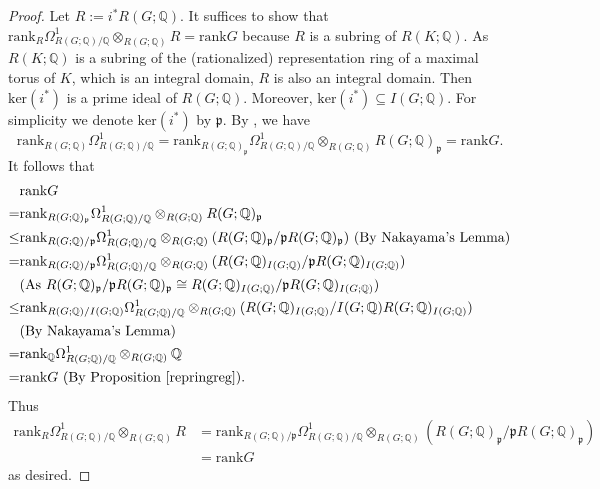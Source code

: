 \documentclass[11pt]{amsart}
\theoremstyle{plain}
\theoremstyle{definition}
\begin{document}
\begin{proof}
	Let $R:=i^*R(G; \mathbb{Q})$. It suffices to show that $\text{rank}_R\Omega^1_{R(G; \mathbb{Q})/\mathbb{Q}}\otimes_{R(G; \mathbb{Q})}R=\text{rank}G$ because $R$ is a subring of $R(K; \mathbb{Q})$. As $R(K; \mathbb{Q})$ is a subring of the (rationalized) representation ring of a maximal torus of $K$, which is an integral domain, $R$ is also an integral domain. Then $\text{ker}(i^*)$ is a prime ideal of $R(G; \mathbb{Q})$. Moreover, $\text{ker}(i^*)\subseteq I(G; \mathbb{Q})$. For simplicity we denote $\text{ker}(i^*)$ by $\mathfrak{p}$. By \cite[Lemmas 7.12(2) and 7.13]{CFok}, we have
	\[\text{rank}_{R(G; \mathbb{Q})}\Omega^1_{R(G; \mathbb{Q})/\mathbb{Q}}=\text{rank}_{R(G; \mathbb{Q})_{\mathfrak{p}}}\Omega^1_{R(G; \mathbb{Q})/\mathbb{Q}}\otimes_{R(G; \mathbb{Q})}R(G; \mathbb{Q})_{\mathfrak{p}}=\text{rank}G.\]
	It follows that 
	\begin{align*}
		&\text{rank}G\\
		=&\text{rank}_{R(G; \mathbb{Q})_{\mathfrak{p}}}\Omega^1_{R(G; \mathbb{Q})/\mathbb{Q}}\otimes_{R(G; \mathbb{Q})}R(G; \mathbb{Q})_{\mathfrak{p}}\\
		\leq &\text{rank}_{R(G; \mathbb{Q})/\mathfrak{p}}\Omega^1_{R(G; \mathbb{Q})/\mathbb{Q}}\otimes_{R(G; \mathbb{Q})}(R(G; \mathbb{Q})_{\mathfrak{p}}/\mathfrak{p}R(G; \mathbb{Q})_{\mathfrak{p}})\ (\text{By Nakayama's Lemma})\\
		=&\text{rank}_{R(G; \mathbb{Q})/\mathfrak{p}}\Omega^1_{R(G; \mathbb{Q})/\mathbb{Q}}\otimes_{R(G; \mathbb{Q})}(R(G; \mathbb{Q})_{I(G; \mathbb{Q})}/\mathfrak{p}R(G; \mathbb{Q})_{I(G; \mathbb{Q})})\\
		&(\text{As }R(G; \mathbb{Q})_{\mathfrak{p}}/\mathfrak{p}R(G; \mathbb{Q})_{\mathfrak{p}}\cong R(G; \mathbb{Q})_{I(G; \mathbb{Q})}/\mathfrak{p}R(G; \mathbb{Q})_{I(G; \mathbb{Q})})\\
		\leq&\text{rank}_{R(G; \mathbb{Q})/I(G; \mathbb{Q})}\Omega^1_{R(G; \mathbb{Q})/\mathbb{Q}}\otimes_{R(G; \mathbb{Q})}(R(G; \mathbb{Q})_{I(G; \mathbb{Q})}/I(G; \mathbb{Q})R(G; \mathbb{Q})_{I(G; \mathbb{Q})})\\
		&(\text{By Nakayama's Lemma})\\
		=&\text{rank}_{\mathbb{Q}}\Omega^1_{R(G; \mathbb{Q})/\mathbb{Q}}\otimes_{R(G; \mathbb{Q})}\mathbb{Q}\\
		=&\text{rank}G\ (\text{By Proposition \ref{repringreg}}).
	\end{align*}
	Thus 
	\begin{align*}
		\text{rank}_R\Omega^1_{R(G; \mathbb{Q})/\mathbb{Q}}\otimes_{R(G; \mathbb{Q})}R&=\text{rank}_{R(G; \mathbb{Q})/\mathfrak{p}}\Omega^1_{R(G; \mathbb{Q})/\mathbb{Q}}\otimes_{R(G; \mathbb{Q})}(R(G; \mathbb{Q})_{\mathfrak{p}}/\mathfrak{p}R(G; \mathbb{Q})_{\mathfrak{p}})\\
		&=\text{rank}G
	\end{align*}
	as desired.
\end{proof}
\end{document}
